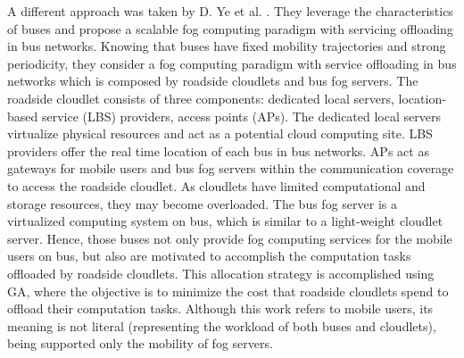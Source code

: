 %
\noindent\tab A different approach was taken by D. Ye et al. \cite{ye2016scalable}. They leverage the characteristics of buses and propose a scalable fog computing paradigm with servicing offloading in bus networks. Knowing that buses have fixed mobility trajectories and strong periodicity, they consider a fog computing paradigm with service offloading in bus networks which is composed by roadside cloudlets and bus fog servers. The roadside cloudlet consists of three components: dedicated local servers, location-based service (LBS) providers, access points (APs). The dedicated local servers virtualize physical resources and act as a potential cloud computing site. LBS providers offer the real time location of each bus in bus networks. APs act as gateways for mobile users and bus fog servers within the communication coverage to access the roadside cloudlet. As cloudlets have limited computational and storage resources, they may become overloaded. The bus fog server is a virtualized computing system on bus, which is similar to a light-weight cloudlet server. Hence, those buses not only provide fog computing services for the mobile users on bus, but also are motivated to accomplish the computation tasks offloaded by roadside cloudlets. This allocation strategy is accomplished using GA, where the objective is to minimize the cost that roadside cloudlets spend to offload their computation tasks. Although this work refers to mobile users, its meaning is not literal (representing the workload of both buses and cloudlets), being supported only the mobility of fog servers.

